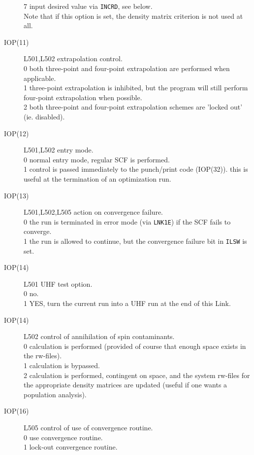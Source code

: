 \begin{description}
7  input desired value via {\tt INCRD}, see below. \\
Note that if this option is set, the density matrix criterion is not
used at all.
\item[IOP(11)] L501,L502  extrapolation control.  \\
0  both three-point and four-point extrapolation are performed when 
applicable.  \\
1  three-point extrapolation is inhibited, but the program will 
still perform four-point extrapolation when possible.  \\
2  both three-point and four-point extrapolation schemes are 'locked 
out' (ie. disabled).  \\
\item[IOP(12)] L501,L502  entry mode.  \\
0  normal entry mode, regular SCF is performed. \\
1  control is passed immediately to the punch/print code (IOP(32)). 
this is useful at the termination of an optimization run.  \\
\item[IOP(13)] L501,L502,L505  action on convergence failure.  \\
0  the run is terminated in error mode (via {\tt LNK1E}) if the SCF fails 
to converge.  \\
1  the run is allowed to continue, but the convergence failure bit 
in {\tt ILSW} is set.  \\
\item[IOP(14)] L501  UHF test option.  \\
0  no. \\
1  YES, turn the current run into a UHF run at the end of this Link. 
\item[IOP(14)] L502 control of annihilation of spin contaminants.  \\
0  calculation is performed (provided of course that enough space 
exists in the rw-files).  \\
1  calculation is bypassed. \\
2  calculation is performed, contingent on space, and the system 
rw-files for the appropriate density matrices are updated (useful
if one wants a population analysis).  \\
\item[IOP(16)] L505  control of use of convergence routine.  \\
0  use convergence routine. \\
1  lock-out convergence routine. \\

\end{description}
